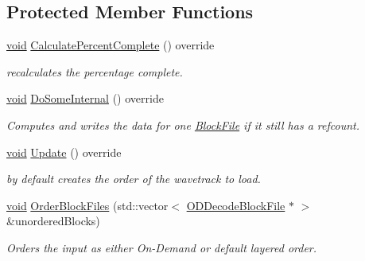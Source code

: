 \subsection*{Protected Member Functions}
\begin{DoxyCompactItemize}
\item 
\hyperlink{sound_8c_ae35f5844602719cf66324f4de2a658b3}{void} \hyperlink{class_o_d_decode_task_a686dab2ef1e1d2cc19eed85852fb722a}{Calculate\+Percent\+Complete} () override
\begin{DoxyCompactList}\small\item\em recalculates the percentage complete. \end{DoxyCompactList}\item 
\hyperlink{sound_8c_ae35f5844602719cf66324f4de2a658b3}{void} \hyperlink{class_o_d_decode_task_abd86c3f6c6d2b7eb7540dec19cf7830d}{Do\+Some\+Internal} () override
\begin{DoxyCompactList}\small\item\em Computes and writes the data for one \hyperlink{class_block_file}{Block\+File} if it still has a refcount. \end{DoxyCompactList}\item 
\hyperlink{sound_8c_ae35f5844602719cf66324f4de2a658b3}{void} \hyperlink{class_o_d_decode_task_a60aad070a6f4fa93b5736865a8b95104}{Update} () override
\begin{DoxyCompactList}\small\item\em by default creates the order of the wavetrack to load. \end{DoxyCompactList}\item 
\hyperlink{sound_8c_ae35f5844602719cf66324f4de2a658b3}{void} \hyperlink{class_o_d_decode_task_a334b4d736f7e24f11567f5d10ab9df76}{Order\+Block\+Files} (std\+::vector$<$ \hyperlink{class_o_d_decode_block_file}{O\+D\+Decode\+Block\+File} $\ast$ $>$ \&unordered\+Blocks)
\begin{DoxyCompactList}\small\item\em Orders the input as either On-\/\+Demand or default layered order. \end{DoxyCompactList}\end{DoxyCompactItemize}
